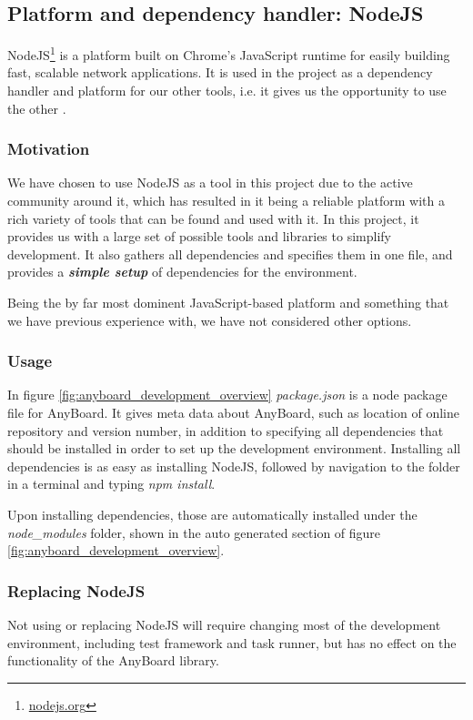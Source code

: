 \subsection{Platform and dependency handler: NodeJS}
NodeJS\footnote{\href{http://nodejs.org}{nodejs.org}} is a platform built on Chrome's JavaScript runtime for easily building fast, scalable network applications. It is used in the project as a dependency handler and platform for our other tools, i.e. it gives us the opportunity to use the other . 

\subsubsection{Motivation}
We have chosen to use NodeJS as a tool in this project due to the active community around it, which has resulted in it being a reliable platform with a rich variety of tools that can be found and used with it. In this project, it provides us with a large set of possible tools and libraries to simplify development. It also gathers all dependencies and specifies them in one file, and provides a \emph{\textbf{simple setup}} of dependencies for the environment. 

Being the by far most dominent JavaScript-based platform and something that we have previous experience with, we have not considered other options.

\subsubsection{Usage}
In figure \ref{fig:anyboard_development_overview} \emph{package.json} is a node package file for AnyBoard. It gives meta data about AnyBoard, such as location of online repository and version number, in addition to specifying all dependencies that should be installed in order to set up the development environment. Installing all dependencies is as easy as installing NodeJS, followed by navigation to the folder in a terminal and typing \emph{npm install}.

Upon installing dependencies, those are automatically installed under the \emph{node\_modules} folder, shown in the auto generated section of figure \ref{fig:anyboard_development_overview}.

\subsubsection{Replacing NodeJS}
Not using or replacing NodeJS will require changing most of the development environment, including test framework and task runner, but has no effect on the functionality of the AnyBoard library.

